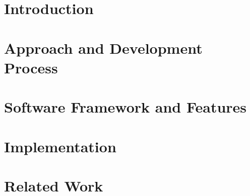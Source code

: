 \documentclass[preprint]{elsarticle}
\begin{document}
\section{Introduction}
\label{sec:introduction}


\section{Approach and Development Process}
\label{sec:pamproc}


\section{Software Framework and Features}
\label{sec:architecture}


\section{Implementation}
\label{sec:implementation}



\label{sec:Experimentations}


\section{Related Work}
\label{sec:related}







\end{document}
